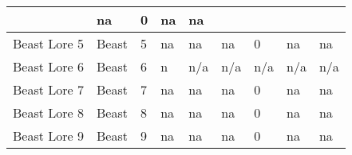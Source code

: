 \documentclass[twoside]{book}
\begin{document}
\begin{longtable}{p{1.25in}lp{2em}p{3em}llp{7em}ll}
  &
   na
           
  &
   0
           
  &
   na
           
  &
   na
           
  \tabularnewline
  \hline
      
  \raggedright
           Beast Lore 5 
  &
   Beast 
  &
   5 
  &
  
           na 
  &
   na
           
  &
   na
           
  &
   0
           
  &
   na
           
  &
   na
           
  \tabularnewline
  \hline
      
  \raggedright
           Beast Lore 6 
  &
   Beast 
  &
   6 
  &
   n
           
  &
   n/a 
  &
   n/a 
  &
   n/a
           
  &
   n/a 
  &
   n/a 
  \tabularnewline
  \hline
      
  \raggedright
           Beast Lore 7 
  &
   Beast 
  &
   7 
  &
  
           na 
  &
   na
           
  &
   na
           
  &
   0
           
  &
   na
           
  &
   na
           
  \tabularnewline
  \hline
      
  \raggedright
           Beast Lore 8 
  &
   Beast 
  &
   8 
  &
  
           na 
  &
   na
           
  &
   na
           
  &
   0
           
  &
   na
           
  &
   na
           
  \tabularnewline
  \hline
      
  \raggedright
           Beast Lore 9 
  &
   Beast 
  &
   9 
  &
  
           na 
  &
   na
           
  &
   na
           
  &
   0
           
  &
   na
           
  &
   na
           
  \tabularnewline
  \hline
      

\end{longtable}
\end{document}
